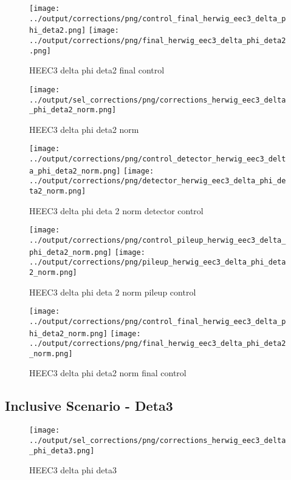 \documentclass[11pt]{book}
\begin{document}
\begin{figure}[ht]
\centering
\texttt{[image: ../output/corrections/png/control\_final\_herwig\_eec3\_delta\_phi\_deta2.png]}
\texttt{[image: ../output/corrections/png/final\_herwig\_eec3\_delta\_phi\_deta2.png]}
\caption{HEEC3 delta phi deta2 final control}
\label{fig:HEEC3_delta_phi_deta2_final_control}
\end{figure}

\begin{figure}[ht]
\centering
\texttt{[image: ../output/sel\_corrections/png/corrections\_herwig\_eec3\_delta\_phi\_deta2\_norm.png]}
\caption{HEEC3 delta phi deta2 norm}
\label{fig:HEEC3_delta_phi_deta2_norm}
\end{figure}


\begin{figure}[ht]
\centering
\texttt{[image: ../output/corrections/png/control\_detector\_herwig\_eec3\_delta\_phi\_deta2\_norm.png]}
\texttt{[image: ../output/corrections/png/detector\_herwig\_eec3\_delta\_phi\_deta2\_norm.png]}
\caption{HEEC3 delta phi deta 2 norm detector control}
\label{fig:HEEC3_delta_phi_deta2_norm_detector_control}
\end{figure}

\begin{figure}[ht]
\centering
\texttt{[image: ../output/corrections/png/control\_pileup\_herwig\_eec3\_delta\_phi\_deta2\_norm.png]}
\texttt{[image: ../output/corrections/png/pileup\_herwig\_eec3\_delta\_phi\_deta2\_norm.png]}
\caption{HEEC3 delta phi deta 2 norm pileup control}
\label{fig:HEEC3_delta_phi_deta2_norm_pileup_control}
\end{figure}


\begin{figure}[ht]
\centering
\texttt{[image: ../output/corrections/png/control\_final\_herwig\_eec3\_delta\_phi\_deta2\_norm.png]}
\texttt{[image: ../output/corrections/png/final\_herwig\_eec3\_delta\_phi\_deta2\_norm.png]}
\caption{HEEC3 delta phi deta2 norm final control}
\label{fig:HEEC3_delta_phi_deta2_norm_final_control}
\end{figure}

\clearpage
\subsection{Inclusive Scenario - Deta3}
\begin{figure}[ht]
\centering
\texttt{[image: ../output/sel\_corrections/png/corrections\_herwig\_eec3\_delta\_phi\_deta3.png]}
\caption{HEEC3 delta phi deta3}
\label{fig:HEEC3_delta_phi_deta3}
\end{figure}
\end{document}
